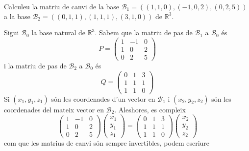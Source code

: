 \begin{exercici}
Calculeu la matriu de canvi de la base $\mathcal{B}%
_{1}=((1,1,0),(-1,0,2),(0,2,5))$ a la base $\mathcal{B}%
_{2}=((0,1,1),(1,1,1),(3,1,0))$ de $\mathbb{R}^{3}$.

\end{exercici}
\begin{solucio}
Sigui $\mathcal{B}_{0}$ la base natural de $\mathbb{R}^{3}$. Sabem que la
matriu de pas de $\mathcal{B}_{1}$ a $\mathcal{B}_{0}$ és%
\begin{equation*}
P=\left(
\begin{array}{ccc}
1 & -1 & 0 \\
1 & 0 & 2 \\
0 & 2 & 5%
\end{array}%
\right)
\end{equation*}%
i la matriu de pas de $\mathcal{B}_{2}$ a $\mathcal{B}_{0}$ és%
\begin{equation*}
Q=\left(
\begin{array}{ccc}
0 & 1 & 3 \\
1 & 1 & 1 \\
1 & 1 & 0%
\end{array}%
\right)
\end{equation*}%
Si $(x_{1},y_{1},z_{1})$ són les coordenades d’un vector en $\mathcal{B}%
_{1} $ i $(x_{2},y_{2},z_{2})$ són les coordenades del mateix vector en $%
\mathcal{B}_{2}$. Aleshores, es compleix%
\begin{equation*}
\left(
\begin{array}{ccc}
1 & -1 & 0 \\
1 & 0 & 2 \\
0 & 2 & 5%
\end{array}%
\right) \left(
\begin{array}{c}
x_{1} \\
y_{1} \\
z_{1}%
\end{array}%
\right) =\left(
\begin{array}{ccc}
0 & 1 & 3 \\
1 & 1 & 1 \\
1 & 1 & 0%
\end{array}%
\right) \left(
\begin{array}{c}
x_{2} \\
y_{2} \\
z_{2}%
\end{array}%
\right)
\end{equation*}%
com que les matrius de canvi són sempre invertibles, podem escriure%

\end{solucio}
